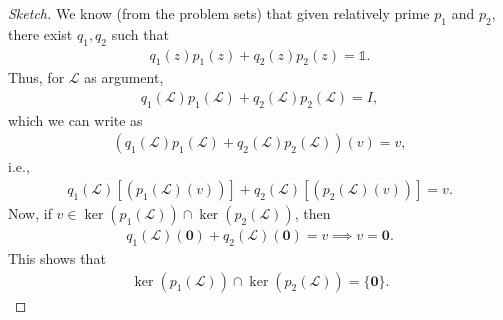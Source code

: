 \documentclass{book}
\theoremstyle{definition}
\newcommand{\lag}{\mathcal{L}}
\begin{document}
\begin{proof}[Sketch]
	We know (from the problem sets) that given relatively prime $p_1$ and $p_2$, there exist $q_1, q_2$ such that 
	\begin{align*}
	q_1(z)p_1(z) + q_2(z)p_2(z) = \mathbb{1}.
	\end{align*}
	Thus, for $\lag$ as argument,
	\begin{align*}
	q_1(\lag)p_1(\lag) + q_2(\lag)p_2(\lag) = I,
	\end{align*}
	which we can write as
	\begin{align*}
	\left(q_1(\lag)p_1(\lag) + q_2(\lag)p_2(\lag)\right)(v) = v,
	\end{align*}
	i.e.,
	\begin{align*}
	q_1(\lag)[(p_1(\lag)(v))] + q_2(\lag)[(p_2(\lag)(v))] = v.
	\end{align*}
	Now, if $v\in \ker(p_1(\lag)) \cap \ker(p_2(\lag))$, then
	\begin{align*}
	q_1(\lag)(\mathbf{0}) + q_2(\lag)(\mathbf{0}) = v \implies v = \mathbf{0}.
	\end{align*} 
	This shows that
	\begin{align*}
	\ker(p_1(\lag)) \cap \ker(p_2(\lag)) = \{ \mathbf{0} \}.
	\end{align*}
\end{proof}
\end{document}
